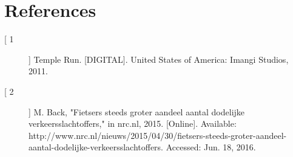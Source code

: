 \documentclass[11pt]{article}
\begin{document}
\newpage
{}
{}
\section*{References}
\begin{description}
\item [[ 1]]  Temple Run. [DIGITAL]. United States of America: Imangi Studios, 2011.
\item [[ 2]] M. Back, "Fietsers steeds groter aandeel aantal dodelijke verkeersslachtoffers," in nrc.nl, 2015. [Online]. 
Available: http://www.nrc.nl/nieuws/2015/04/30/fietsers-steeds-groter-aandeel-aantal-dodelijke-verkeersslachtoffers. Accessed: Jun. 18, 2016.
\end{description}
\end{document}
